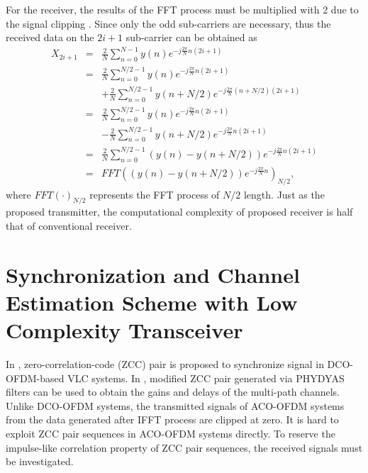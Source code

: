 \documentclass[10pt,journal]{IEEEtran}
\begin{document}
		For the receiver, the results of the FFT process must be multiplied with 2 due to the signal clipping \cite{Wang2017Optical}. Since only the odd sub-carriers are necessary, thus the received data on the $ 2i+1 $ sub-carrier can be obtained as
		\begin{eqnarray}\label{equ:sim_receiver}
            X_{2i+1}&=& \frac{2}{N}\sum_{n=0}^{N-1} y(n) e^{-j\frac{2\pi}{N}n(2i+1)}\nonumber\\
			&=& \frac{2}{N}\sum_{n=0}^{N/2-1} y(n) e^{-j\frac{2\pi}{N}n(2i+1)}  \nonumber\\
			&&+ \frac{2}{N}\sum_{n=0}^{N/2-1} y(n+N/2) e^{-j\frac{2\pi}{N}(n+N/2)(2i+1)} \nonumber\\
			&=& \frac{2}{N}\sum_{n=0}^{N/2-1} y(n) e^{-j\frac{2\pi}{N}n(2i+1)}  \nonumber\\
			&&- \frac{2}{N}\sum_{n=0}^{N/2-1} y(n+N/2) e^{-j\frac{2\pi}{N}n(2i+1)} \nonumber\\
			&=& \frac{2}{N}\sum_{n=0}^{N/2-1} ( y(n)-y(n+N/2) ) e^{-j\frac{2\pi}{N}n(2i+1)}  \nonumber\\
			&=& FFT( ( y(n)-y(n+N/2) ) e^{-j\frac{2\pi}{N}n} )_{N/2},
		\end{eqnarray}
		where $ FFT(\cdot)_{N/2} $	represents the FFT process of $ N/2 $ length. Just as the proposed transmitter, the computational complexity of proposed receiver is half that of conventional receiver.


\section{Synchronization and Channel Estimation Scheme with Low Complexity Transceiver}
	In \cite{Qian2016Synchronisation}, zero-correlation-code (ZCC) pair is proposed to synchronize signal in DCO-OFDM-based VLC systems. In \cite{Qian2017}, modified ZCC pair generated via PHYDYAS filters can be used to obtain the gains and delays of the multi-path channels.
Unlike DCO-OFDM systems, the transmitted signals of ACO-OFDM systems from the data generated after IFFT process are clipped at zero. It is hard to exploit ZCC pair sequences in ACO-OFDM systems directly. To reserve the impulse-like correlation property of ZCC pair sequences, the received signals must be investigated.
\end{document}
